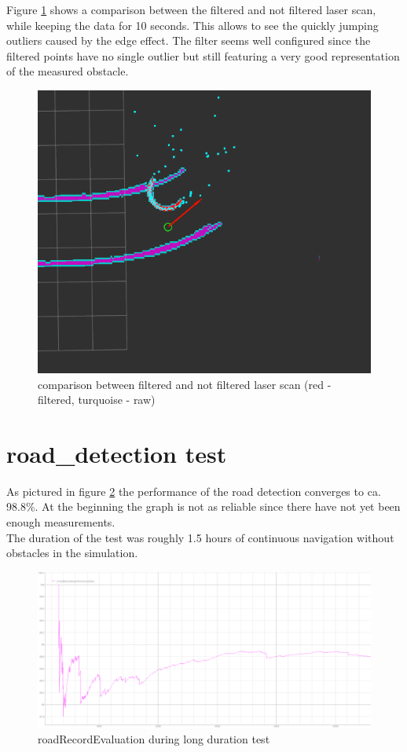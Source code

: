 Figure \ref{lasercomp} shows a comparison between the filtered and not filtered laser scan, while keeping the data for 10 seconds. This allows to see the quickly jumping outliers caused by the edge effect. The filter seems well configured since the filtered points have no single outlier but still featuring a very good representation of the measured obstacle.

\begin{figure}[H]
	\includegraphics[width=\textwidth]{Pictures/LASERFILTER COMP}	
	\caption{comparison between filtered and not filtered laser scan (red - filtered, turquoise - raw)}
	\label{lasercomp}
\end{figure}

\section{road\_detection test}

As pictured in figure \ref{longdurroad} the performance of the road detection converges to ca. 98.8\%. At the beginning the graph is not as reliable since there have not yet been enough measurements.\\

The duration of the test was roughly 1.5 hours of continuous navigation without obstacles in the simulation.

\begin{figure}[H]
	\includegraphics[width=\textwidth]{Pictures/long duration road detection test}
	\caption{roadRecordEvaluation during long duration test}
	\label{longdurroad}
\end{figure}

